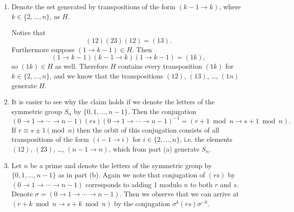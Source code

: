 \documentclass{article}
\begin{document}
\begin{Answer}
\begin{enumerate}
  \item{
    Denote the set generated by transpositions of the form $(k - 1 \to
    k)$, where $k \in \{2, \dots, n \}$, as $H$.

    Notice that
    $$
    (12)(23)(12) = (13).
    $$
    Furthermore suppose $(1 \to k - 1) \in H$. Then
    $$
    (1 \to k - 1)(k - 1 \to k)(1 \to k - 1) =
    (1k),
    $$
    so $(1k) \in H$ as well.
    Therefore $H$ contains every transposition $(1k)$ for
    $k \in \{ 2, \dots, n \}$, and we know that the transpositions
    $(12)$, $(13)$, \dots, $(1n)$ generate $H$.
  }
  \item{
    It is easier to see why the claim holds if we
    denote the letters of the symmetric group $S_n$ by $\{0, 1, \dots,
    n-1\}$. Then the conjugation
    $$
    (0 \to 1 \to \cdots \to n-1)
    (rs)
    (0 \to 1 \to \cdots \to n-1)^{-1} =
    (r + 1 \bmod n \to s + 1 \bmod n).
    $$
    If $r \equiv s \pm 1 \pmod{n}$ then the orbit of this conjugation consists of
    all transpositions of the form $(i-1 \to i)$ for $i \in \{2, \dots,
    n\}$, i.e. the elements
    $(12)$, $(23)$, \dots, $(n-1 \to n)$, which from part (a)
    generate $S_n$.
  }
  \item{
    Let $n$ be a prime and denote the letters of the symmetric group
    by $\{0, 1, \dots, n - 1\}$ as in part (b). Again we note that
    conjugation of $(rs)$ by $(0 \to 1 \to \cdots \to n-1)$
    corresponds to adding 1 modulo $n$ to both $r$ and $s$.
    Denote $\sigma = (0 \to 1 \to \cdots \to n-1)$. Then we observe
    that we can arrive at $(r + k \bmod n \to s + k \bmod n)$ by
    the conjugation $\sigma^k (rs) \sigma^{-k}$.

%

}
\end{enumerate}
\end{Answer}
\end{document}
